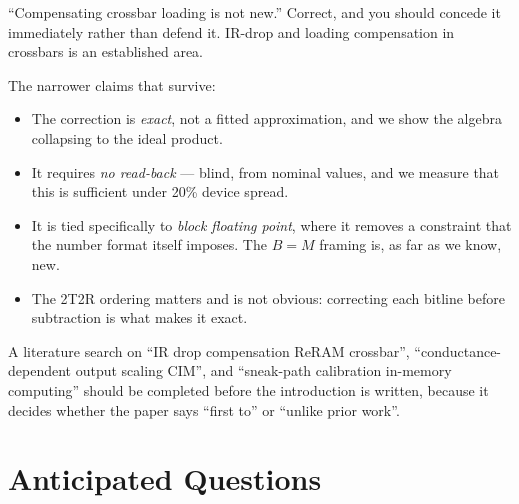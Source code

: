\documentclass[11pt,a4paper]{report}
\begin{document}
\begin{warnbox}{``Compensating crossbar loading is not new.''}
Correct, and you should concede it immediately rather than defend it.
IR-drop and loading compensation in crossbars is an established area.

The narrower claims that survive:
\begin{itemize}[leftmargin=1.3em]
  \item The correction is \emph{exact}, not a fitted approximation, and we
        show the algebra collapsing to the ideal product.
  \item It requires \emph{no read-back} --- blind, from nominal values, and we
        measure that this is sufficient under 20\% device spread.
  \item It is tied specifically to \emph{block floating point}, where it
        removes a constraint that the number format itself imposes. The
        $B = M$ framing is, as far as we know, new.
  \item The 2T2R ordering matters and is not obvious: correcting each bitline
        before subtraction is what makes it exact.
\end{itemize}

A literature search on ``IR drop compensation ReRAM crossbar'',
``conductance-dependent output scaling CIM'', and ``sneak-path calibration
in-memory computing'' should be completed before the introduction is written,
because it decides whether the paper says ``first to'' or ``unlike prior
work''.
\end{warnbox}

\chapter{Anticipated Questions}
\end{document}
